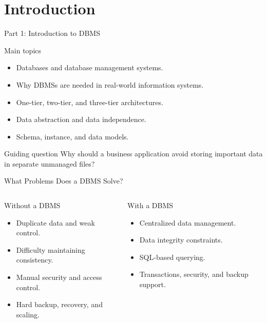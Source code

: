 \documentclass[aspectratio=169,11pt]{beamer}
\begin{document}
\section{Introduction}
\begin{frame}{Part 1: Introduction to DBMS}
\begin{block}{Main topics}
\begin{itemize}
  \item Databases and database management systems.
  \item Why DBMSs are needed in real-world information systems.
  \item One-tier, two-tier, and three-tier architectures.
  \item Data abstraction and data independence.
  \item Schema, instance, and data models.
\end{itemize}
\end{block}

\begin{alertblock}{Guiding question}
Why should a business application avoid storing important data in separate unmanaged files?
\end{alertblock}
\end{frame}

\begin{frame}{What Problems Does a DBMS Solve?}
\begin{columns}[T,onlytextwidth]
\begin{block}{Without a DBMS}
\begin{itemize}
  \item Duplicate data and weak control.
  \item Difficulty maintaining consistency.
  \item Manual security and access control.
  \item Hard backup, recovery, and scaling.
\end{itemize}
\end{block}
\begin{block}{With a DBMS}
\begin{itemize}
  \item Centralized data management.
  \item Data integrity constraints.
  \item SQL-based querying.
  \item Transactions, security, and backup support.
\end{itemize}
\end{block}
\end{columns}
\end{frame}
\end{document}
